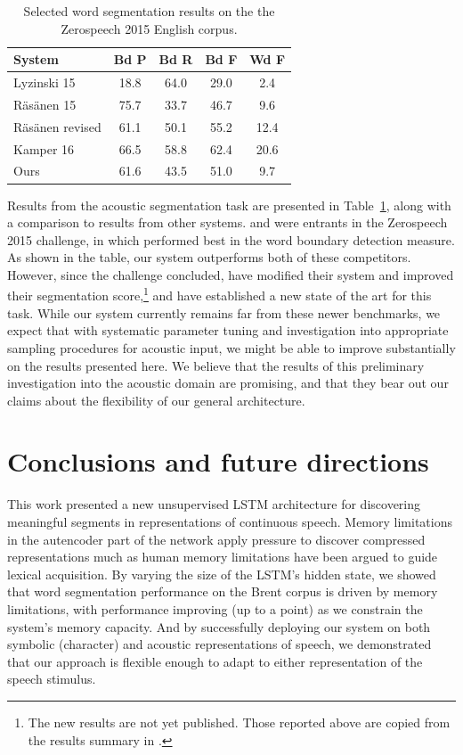 \documentclass[11pt,letterpaper]{article}
\begin{document}
\begin{table}
\begin{tabular}{p{2.1cm}cccc}
System & Bd P & Bd R & Bd F & Wd F\\
\hline
Lyzinski 15           & 18.8 & 64.0 & 29.0 & 2.4\\
R\"{a}s\"{a}nen 15       & 75.7 & 33.7 & 46.7 & 9.6\\
R\"{a}s\"{a}nen revised       & 61.1 & 50.1 & 55.2 & 12.4\\
Kamper 16       & 66.5 & 58.8 & 62.4 & 20.6\\
\hline
Ours & 61.6 & 43.5 & 51.0 & 9.7\\
\end{tabular}
\caption{Selected word segmentation results on the the Zerospeech 2015 English corpus.}
\label{tab-acoust-results}
\end{table}

Results from the acoustic segmentation task are presented in Table~\ref{tab-acoust-results}, along with a comparison to results from other systems.
 and  were entrants in the Zerospeech 2015 challenge, in which \cite{Rasanen15} performed best in the word boundary detection measure.
As shown in the table, our system outperforms both of these competitors.
However, since the challenge concluded,  have modified their system and improved their segmentation score,\footnote{The new results are not yet published. Those reported above are copied from the results summary in .} and  have established a new state of the art for this task.
While our system currently remains far from these newer benchmarks, we expect that with systematic parameter tuning and investigation into appropriate sampling procedures for acoustic input, we might be able to improve substantially on the results presented here.
We believe that the results of this preliminary investigation into the acoustic domain are promising, and that they bear out our claims about the flexibility of our general architecture.


\section{Conclusions and future directions}

This work presented a new unsupervised LSTM architecture for discovering meaningful segments in representations of continuous speech.
Memory limitations in the autencoder part of the network apply pressure to discover compressed representations much as human memory limitations have been argued to guide lexical acquisition.
By varying the size of the LSTM's hidden state, we showed that word segmentation performance on the Brent corpus is driven by memory limitations, with performance improving (up to a point) as we constrain the system's memory capacity.
And by successfully deploying our system on both symbolic (character) and acoustic representations of speech, we demonstrated that our approach is flexible enough to adapt to either representation of the speech stimulus.
\end{document}
